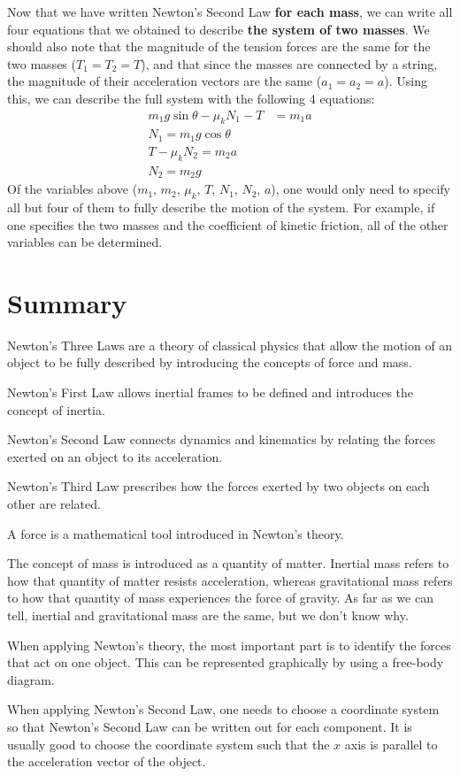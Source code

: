 \begin{example}
Now that we have written Newton's Second Law \textbf{for each mass}, we can write all four equations that we obtained to describe \textbf{the system of two masses}. We should also note that the magnitude of the tension forces are the same for the two masses ($T_1=T_2=T$), and that since the masses are connected by a string, the magnitude of their acceleration vectors are the same ($a_1=a_2=a$). Using this, we can describe the full system with the following 4 equations:
\begin{align*}
m_1 g\sin\theta -\mu_k N_1 - T &= m_1 a\\
N_1=m_1g\cos\theta\\
T - \mu_k N_2 = m_2 a\\
N_2 = m_2g
\end{align*}
Of the variables above ($m_1$, $m_2$, $\mu_k$, $T$, $N_1$, $N_2$, $a$), one would only need to specify all but four of them to fully describe the motion of the system. For example, if one specifies the two masses and the coefficient of kinetic friction, all of the other variables can be determined.

\end{example}

\newpage
\section{Summary}
\vspace{1cm}
\begin{chapterSummary}
\item Newton's Three Laws are a theory of classical physics that allow the motion of an object to be fully described by introducing the concepts of force and mass.
\item Newton's First Law allows inertial frames to be defined and introduces the concept of inertia. 
\item Newton's Second Law connects dynamics and kinematics by relating the forces exerted on an object to its acceleration.
\item Newton's Third Law prescribes how the forces exerted by two objects on each other are related.
\item A force is a mathematical tool introduced in Newton's theory.
\item The concept of mass is introduced as a quantity of matter. Inertial mass refers to how that quantity of matter resists acceleration, whereas gravitational mass refers to how that quantity of mass experiences the force of gravity. As far as we can tell, inertial and gravitational mass are the same, but we don't know why. 
\item When applying Newton's theory, the most important part is to identify the forces that act on one object. This can be represented graphically by using a free-body diagram.
\item When applying Newton's Second Law, one needs to choose a coordinate system so that Newton's Second Law can be written out for each component. It is usually good to choose the coordinate system such that the $x$ axis is parallel to the acceleration vector of the object.
\end{chapterSummary}


